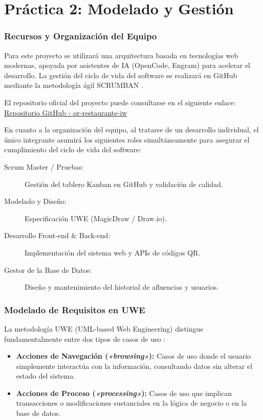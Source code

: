 \part{Práctica 2: Modelado y Gestión}

\section{Recursos y Organización del Equipo}
Para este proyecto se utilizará una arquitectura basada en tecnologías web modernas, apoyada por asistentes de IA (OpenCode, Engram) para acelerar el desarrollo. La gestión del ciclo de vida del software se realizará en GitHub mediante la metodología ágil SCRUMBAN \cite{SCRUMBAN}.

El repositorio oficial del proyecto puede consultarse en el siguiente enlace: \href{https://github.com/Jsoriano99/qr-restaurante-iw}{Repositorio GitHub - qr-restaurante-iw}

En cuanto a la organización del equipo, al tratarse de un desarrollo individual, el único integrante asumirá los siguientes roles simultáneamente para asegurar el cumplimiento del ciclo de vida del software:

\begin{description}
    \item[Scrum Master / Pruebas:] Gestión del tablero Kanban en GitHub y validación de calidad.
    \item[Modelado y Diseño:] Especificación UWE (MagicDraw / Draw.io).
    \item[Desarrollo Front-end \& Back-end:] Implementación del sistema web y APIs de códigos QR.
    \item[Gestor de la Base de Datos:] Diseño y mantenimiento del historial de afluencias y usuarios.
\end{description}

\section{Modelado de Requisitos en UWE}
La metodología UWE (UML-based Web Engineering) distingue fundamentalmente entre dos tipos de casos de uso \cite{UWE2014}:
\begin{itemize}
    \item \textbf{Acciones de Navegación (\textit{«browsing»}):} Casos de uso donde el usuario simplemente interactúa con la información, consultando datos sin alterar el estado del sistema. 
    \item \textbf{Acciones de Proceso (\textit{«processing»}):} Casos de uso que implican transacciones o modificaciones sustanciales en la lógica de negocio o en la base de datos.
\end{itemize}

